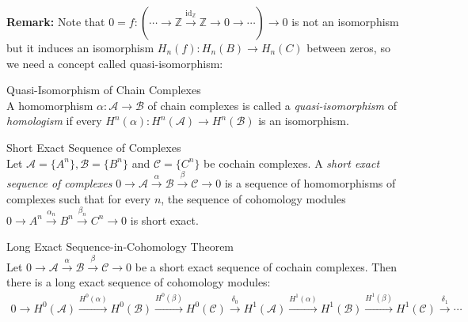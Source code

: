 \noindent\textbf{Remark:} Note that $0=f: (\cdots \to \mathbb{Z} \xrightarrow{\text{id}_\mathbb{Z}} \mathbb{Z} \to 0\to \cdots) \to 0$ is not an isomorphism but it induces an isomorphism $H_n(f) :H_n(B) \to H_n(C)$ between zeros, so we need a concept called quasi-isomorphism:

\begin{definition}{Quasi-Isomorphism of Chain Complexes}\\
A homomorphism $\alpha :\mathcal{A} \to \mathcal{B}$ of chain complexes is called a \textit{quasi-isomorphism} of \textit{homologism} if every $H^n (\alpha) :H^n (\mathcal{A}) \to H^n (\mathcal{B})$ is an isomorphism.
\end{definition}

\begin{definition}{Short Exact Sequence of Complexes}\\
Let $\mathcal{A}= \{A^n\} , \mathcal{B} =\{B^n\}$ and $\mathcal{C}= \{C^n\}$ be cochain complexes. A \textit{short exact sequence of complexes} $0 \to \mathcal{A} \overset{\alpha}{\to} \mathcal{B} \overset{\beta}{\to} \mathcal{C} \to 0$ is a sequence of homomorphisms of complexes such that for every $n$, the sequence of cohomology modules $0\to A^n \overset{\alpha_n}{\longrightarrow} B^n \overset{\beta_n}{\longrightarrow} C^n \to 0$ is short exact.
\end{definition}

\begin{theorem}{Long Exact Sequence-in-Cohomology Theorem}\\
Let $0\to \mathcal{A} \overset{\alpha}{\longrightarrow} \mathcal{B} \overset{\beta}{\longrightarrow} \mathcal{C} \to 0$ be a short exact sequence of cochain complexes. Then there is a long exact sequence of cohomology modules:
\begin{align*}
    0 \to H^0 (\mathcal{A}) \xrightarrow{H^0(\alpha)} H^0(\mathcal{B}) \xrightarrow{H^0 (\beta)} H^0(\mathcal{C}) \xrightarrow{\delta_0} H^1(\mathcal{A}) \xrightarrow{H^1 (\alpha)} H^1 (\mathcal{B}) \xrightarrow{H^1(\beta)} H^1 (\mathcal{C}) \xrightarrow{\delta_1} \cdots
\end{align*}
\end{theorem}

